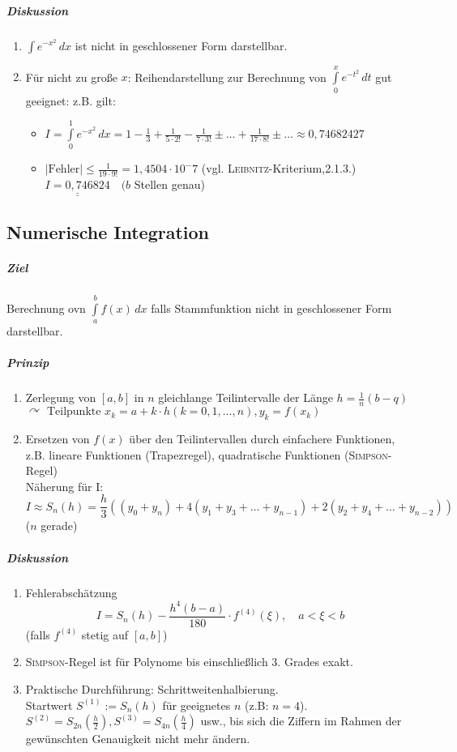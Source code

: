 \documentclass[a4paper]{scrartcl}
\begin{document}
\subparagraph{Diskussion}
\begin{enumerate}
\item $\int e^{-x^2} \, dx$ ist nicht in geschlossener Form darstellbar.
\item Für nicht zu große $x$: Reihendarstellung zur Berechnung von $\int\limits_0^x e^{-t^2} \, dt$ gut geeignet: z.B. gilt:
\begin{itemize}
\item $I=\int\limits_0^1 e^{-x^2} \, dx = 1 -\frac{1}{3} + \frac{1}{5\cdot 2!} - \frac{1}{7\cdot 3!}  \pm \dots + \frac{1}{17\cdot 8!} \pm \dots \approx 0,74682427 $
\item $\lvert \text{Fehler} \rvert \leq \frac{1}{19\cdot 9!} = 1,4504 \cdot 10^-7$ (vgl. \textsc{Leibnitz}-Kriterium,2.1.3.)\\
$\underline{\underline{I = 0,746824}} \quad (b$ Stellen genau)
\end{itemize}
\end{enumerate}

\subsection{Numerische Integration}
\subparagraph{Ziel} Berechnung ovn $\int\limits_a^b f(x) \, dx$ falls Stammfunktion nicht in geschlossener Form darstellbar.
\subparagraph{Prinzip}
\begin{enumerate}
\item Zerlegung von $[a,b]$ in $n$ gleichlange Teilintervalle der Länge $h= \frac{1}{n} (b-q)$\\
$\curvearrowright \text{ Teilpunkte } x_k = a + k\cdot h (k=0,1,\dots,n), y_k = f(x_k)$
\item Ersetzen von $f(x)$ über den Teilintervallen durch einfachere Funktionen, z.B. lineare Funktionen (Trapezregel), quadratische Funktionen (\textsc{Simpson}-Regel)\\
Näherung für I:
\begin{equation}\label{431}I \approx S_n(h) = \frac{h}{3} ((y_0 + y_n ) +4(y_1+y_3+\dots + y_{n-1}) + 2(y_2 +y_4 + \dots + y_{n-2}))\end{equation}
($n$ gerade)

\end{enumerate}


\subparagraph{Diskussion}
\begin{enumerate}
\item Fehlerabschätzung
\[ I = S_n (h) - \frac{h^4 (b-a)}{180} \cdot f^{(4)} (\xi), \quad a < \xi < b\]
(falls $f^{(4)}$ stetig auf $[a,b]$)
\item \textsc{Simpson}-Regel ist für Polynome bis einschließlich 3. Grades exakt.
\item Praktische Durchführung: Schrittweitenhalbierung.\\
Startwert $S^{(1)} := S_n(h)$ für geeignetes $n$ (z.B: $n=4$).\\
$S^{(2)} = S_{2n} (\frac{h}{2}), S^{(3)} = S_{4n} (\frac{h}{4})$ usw., bis sich die Ziffern im Rahmen der gewünschten Genauigkeit nicht mehr ändern.
\end{enumerate}
\end{document}
